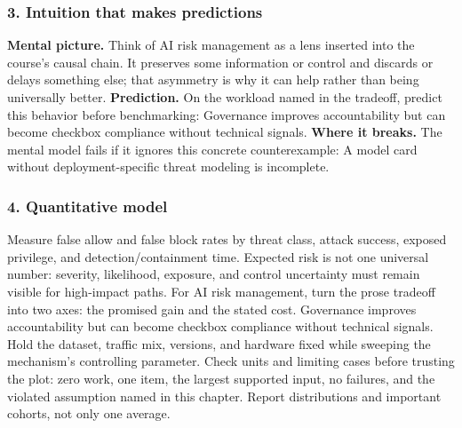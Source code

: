 \subsubsection*{3. Intuition that makes predictions}
\textbf{Mental picture.} Think of AI risk management as a lens inserted into the course's causal chain. It preserves some information or control and discards or delays something else; that asymmetry is why it can help rather than being universally better.
\textbf{Prediction.} On the workload named in the tradeoff, predict this behavior before benchmarking: Governance improves accountability but can become checkbox compliance without technical signals.
\textbf{Where it breaks.} The mental model fails if it ignores this concrete counterexample: A model card without deployment-specific threat modeling is incomplete.
\subsubsection*{4. Quantitative model}
Measure false allow and false block rates by threat class, attack success, exposed privilege, and detection/containment time. Expected risk is not one universal number: severity, likelihood, exposure, and control uncertainty must remain visible for high-impact paths.
For AI risk management, turn the prose tradeoff into two axes: the promised gain and the stated cost. Governance improves accountability but can become checkbox compliance without technical signals. Hold the dataset, traffic mix, versions, and hardware fixed while sweeping the mechanism's controlling parameter.
Check units and limiting cases before trusting the plot: zero work, one item, the largest supported input, no failures, and the violated assumption named in this chapter. Report distributions and important cohorts, not only one average.
